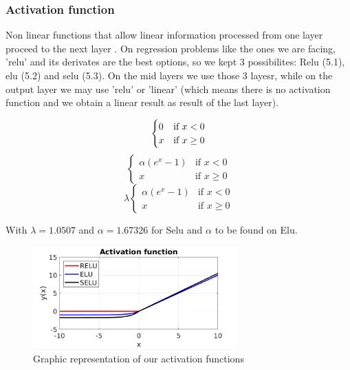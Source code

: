 \documentclass[openany]{article}
\begin{document}
\subsubsection*{Activation function}

Non linear functions that allow linear information processed from one layer proceed to the next layer \cite{sharma2017activation}. On regression problems like the ones we are facing, 'relu' and its derivates are the best options, so we kept 3 possibilites: Relu (5.1), elu (5.2) and selu (5.3). On the mid layers we use those 3 layesr, while on the output layer we may use 'relu' or 'linear' (which means there is no activation function and we obtain a linear result as result of the last layer).



\begin{multicols}{3}
\begin{equation}
\centering
    \begin{cases}
    0 & \text{if } x < 0\\
    x & \text{if } x \geq 0
\end{cases}
\end{equation}\break
\begin{equation}
    \begin{cases}
    \alpha(e^x - 1) & \text{if } x < 0\\
    x & \text{if } x \geq 0
\end{cases}
\end{equation}\break
\begin{equation}
    \lambda \begin{cases}
    \alpha(e^x - 1) & \text{if } x < 0\\
    x & \text{if } x \geq 0 
    \end{cases}
\end{equation}
\end{multicols}

With \(\lambda = 1.0507\) and \(\alpha = 1.67326\) for Selu and \(\alpha\) to be found on Elu.


\begin{figure}[!h]
    \centering
    \includegraphics[width=0.7\textwidth]{Activations.png}
    \caption{Graphic representation of our activation functions}
    \label{fig:my_label}
\end{figure}
\end{document}
